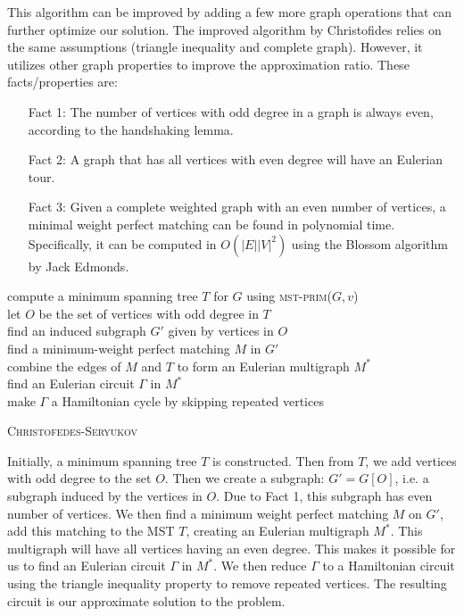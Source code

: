 \documentclass[11pt]{article}
\begin{document}
  This algorithm can be improved by adding a few more graph operations that can further optimize our solution.
  The improved algorithm by Christofides relies on the same assumptions (triangle inequality and complete graph). 
  However, it utilizes other graph properties to improve the approximation ratio. These facts/properties are:
  \begin{enumerate}
    \item[Fact 1:] The number of vertices with odd degree in a graph is always even, according to the handshaking lemma. 
    \item[Fact 2:] A graph that has all vertices with even degree will have an Eulerian tour. 
    \item[Fact 3:] Given a complete weighted graph with an even number of vertices, a minimal weight perfect matching can be found in polynomial 
     time. Specifically, it can be computed in $O(|E||V|^2)$  using the Blossom algorithm by Jack Edmonds.
  \end{enumerate} 
  \begin{algorithm*}
    compute a minimum spanning tree $T$ for $G$ using \textsc{mst-prim}($G, v$) \\
    let $O$ be the set of vertices with odd degree in $T$ \\
    find an induced subgraph $G'$ given by vertices in $O$ \\
    find a minimum-weight perfect matching $M$ in $G'$ \\
    combine the edges of $M$ and $T$ to form an Eulerian multigraph $M^*$ \\
    find an Eulerian circuit $\Gamma$ in $M^*$ \\
    make $\Gamma$ a Hamiltonian cycle by skipping repeated vertices \\
    \caption{\textsc{Christofedes-Seryukov}}
\end{algorithm*}
  
  Initially, a minimum spanning tree $T$ is constructed. Then from $T$, we add vertices with odd degree to the set $O$. 
  Then we create a subgraph: $G' = G[O]$, i.e. a subgraph induced by the vertices in $O$. Due to Fact 1, this subgraph has 
  even number of vertices. We then find a minimum weight perfect matching $M$ on $G'$, add this matching to the MST $T$, creating 
  an Eulerian multigraph $M^*$. This multigraph will have all vertices having an even degree. This makes it possible for us 
  to find an Eulerian circuit $\Gamma$ in $M^*$. We then reduce $\Gamma$ to a Hamiltonian circuit using the triangle inequality 
  property to remove repeated vertices. The resulting circuit is our approximate solution to the problem. 
\end{document}
